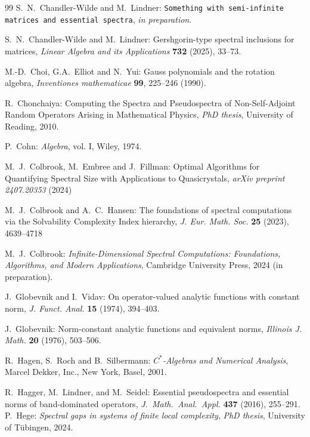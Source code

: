 \documentclass{article}
\numberwithin{equation}{section}   %
\numberwithin{figure}{section}  %
\begin{document}
\begin{thebibliography}{99}
{\sc S.~N.~Chandler-Wilde} and {\sc M.~Lindner:}
{\tt Something with semi-infinite matrices and essential spectra},
{\it in preparation}.

{\sc S.~N.~Chandler-Wilde} and {\sc M.~Lindner:}
Gershgorin-type spectral inclusions for matrices,
{\it Linear Algebra and its Applications} {\bf 732} (2025), 33--73.


{\sc M.-D.~Choi, G.A.~Elliot} and {\sc N.~Yui}:
Gauss polynomials and the rotation algebra,
{\it Inventiones mathematicae} {\bf 99}, 225--246 (1990).

{\sc R.~Chonchaiya}:
Computing the Spectra and Pseudospectra of Non-Self-Adjoint Random Operators Arising in Mathematical Physics,
{\it PhD thesis}, University of Reading, 2010.

{\sc P.~Cohn}:
{\it Algebra}, vol. I, 
Wiley, 1974.

{\sc M.~J.~Colbrook, M.~Embree} and {\sc J.~Fillman:}
Optimal Algorithms for Quantifying Spectral Size
with Applications to Quasicrystals,
{\it arXiv preprint 2407.20353} (2024)

{\sc M.~J.~Colbrook} and {\sc A.~C.~Hansen:}
The foundations of spectral computations via the
Solvability Complexity Index hierarchy,
{\it J. Eur. Math. Soc.} {\bf 25} (2023), 4639--4718

{\sc M.~J.~Colbrook:}
{\it Infinite-Dimensional Spectral Computations: Foundations, Algorithms, and Modern Applications}, Cambridge University Press, 2024 (in preparation).


%
%
{\sc J.~Globevnik} and {\sc I.~Vidav}:
On operator-valued analytic functions with constant norm,
\textit{J. Funct. Anal.}
{\bf 15} (1974), 394–403.

{\sc J.~Globevnik}:
Norm-constant analytic functions and equivalent norms,
\textit{Illinois J. Math.}
{\bf 20} (1976), 503--506.

{\sc R.~Hagen, S.~Roch} and {\sc B.~Silbermann:}
{\it $C^*$-Algebras and Numerical Analysis},
Marcel Dekker, Inc., New York, Basel, 2001.

{\sc R.~Hagger, M.~Lindner}, and {\sc M.~Seidel:}
Essential pseudospectra and essential norms of band-dominated operators,
\textit{J.\ Math.\ Anal.\ Appl.\@}
\textbf{437}
(2016),
255--291.
%
%
%
{\sc P.~Hege}:
{\it Spectral gaps in systems of finite local complexity},
{\it PhD thesis}, University of T\"ubingen, 2024.


\end{thebibliography}
\end{document}
